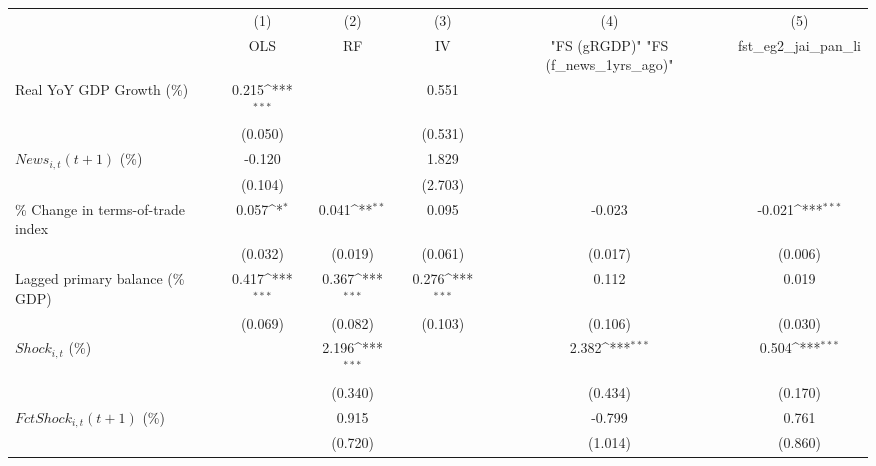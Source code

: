 {
\def\sym#1{\ifmmode^{#1}\else\(^{#1}\)\fi}
\begin{tabular}{l*{5}{c}}
\toprule
                    &\multicolumn{1}{c}{(1)}&\multicolumn{1}{c}{(2)}&\multicolumn{1}{c}{(3)}&\multicolumn{1}{c}{(4)}&\multicolumn{1}{c}{(5)}\\
                    &\multicolumn{1}{c}{OLS}&\multicolumn{1}{c}{RF}&\multicolumn{1}{c}{IV}&\multicolumn{1}{c}{ "FS (gRGDP)"  "FS (f_news_1yrs_ago)" }&\multicolumn{1}{c}{fst_eg2_jai_pan_li}\\
\midrule
Real YoY GDP Growth (\%)&       0.215\sym{***}&                     &       0.551         &                     &                     \\
                    &     (0.050)         &                     &     (0.531)         &                     &                     \\
\addlinespace
$ News_{i,t}(t+1)$ (\%)&      -0.120         &                     &       1.829         &                     &                     \\
                    &     (0.104)         &                     &     (2.703)         &                     &                     \\
\addlinespace
\% Change in terms-of-trade index&       0.057\sym{*}  &       0.041\sym{**} &       0.095         &      -0.023         &      -0.021\sym{***}\\
                    &     (0.032)         &     (0.019)         &     (0.061)         &     (0.017)         &     (0.006)         \\
\addlinespace
Lagged primary balance (\% GDP)&       0.417\sym{***}&       0.367\sym{***}&       0.276\sym{***}&       0.112         &       0.019         \\
                    &     (0.069)         &     (0.082)         &     (0.103)         &     (0.106)         &     (0.030)         \\
\addlinespace
$ Shock_{i,t}$ (\%) &                     &       2.196\sym{***}&                     &       2.382\sym{***}&       0.504\sym{***}\\
                    &                     &     (0.340)         &                     &     (0.434)         &     (0.170)         \\
\addlinespace
$ FctShock_{i,t}(t+1)$ (\%)&                     &       0.915         &                     &      -0.799         &       0.761         \\
                    &                     &     (0.720)         &                     &     (1.014)         &     (0.860)         \\

\end{tabular}}
